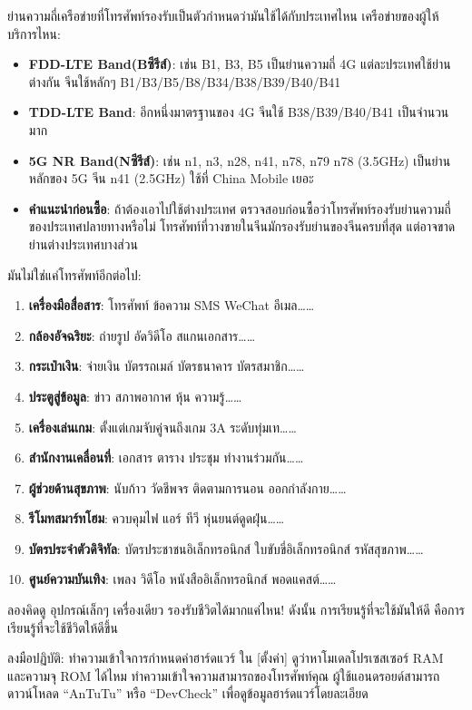 
ย่านความถี่เครือข่ายที่โทรศัพท์รองรับเป็นตัวกำหนดว่ามันใช้ได้กับประเทศไหน เครือข่ายของผู้ให้บริการไหน:

\begin{itemize}
  \item \textbf{FDD-LTE Band(Bซีรีส์)}: เช่น B1, B3, B5 เป็นย่านความถี่ 4G แต่ละประเทศใช้ย่านต่างกัน จีนใช้หลักๆ B1/B3/B5/B8/B34/B38/B39/B40/B41
  \item \textbf{TDD-LTE Band}: อีกหนึ่งมาตรฐานของ 4G จีนใช้ B38/B39/B40/B41 เป็นจำนวนมาก
  \item \textbf{5G NR Band(Nซีรีส์)}: เช่น n1, n3, n28, n41, n78, n79 n78 (3.5GHz) เป็นย่านหลักของ 5G จีน n41 (2.5GHz) ใช้ที่ China Mobile เยอะ
  \item \textbf{คำแนะนำก่อนซื้อ}: ถ้าต้องเอาไปใช้ต่างประเทศ ตรวจสอบก่อนซื้อว่าโทรศัพท์รองรับย่านความถี่ของประเทศปลายทางหรือไม่ โทรศัพท์ที่วางขายในจีนมักรองรับย่านของจีนครบที่สุด แต่อาจขาดย่านต่างประเทศบางส่วน
\end{itemize}


มันไม่ใช่แค่โทรศัพท์อีกต่อไป:

\begin{enumerate}
  \item \textbf{เครื่องมือสื่อสาร}: โทรศัพท์ ข้อความ SMS WeChat อีเมล……
  \item \textbf{กล้องอัจฉริยะ}: ถ่ายรูป อัดวิดีโอ สแกนเอกสาร……
  \item \textbf{กระเป๋าเงิน}: จ่ายเงิน บัตรรถเมล์ บัตรธนาคาร บัตรสมาชิก……
  \item \textbf{ประตูสู่ข้อมูล}: ข่าว สภาพอากาศ หุ้น ความรู้……
  \item \textbf{เครื่องเล่นเกม}: ตั้งแต่เกมจับคู่จนถึงเกม 3A ระดับทุ่มเท……
  \item \textbf{สำนักงานเคลื่อนที่}: เอกสาร ตาราง ประชุม ทำงานร่วมกัน……
  \item \textbf{ผู้ช่วยด้านสุขภาพ}: นับก้าว วัดชีพจร ติดตามการนอน ออกกำลังกาย……
  \item \textbf{รีโมทสมาร์ทโฮม}: ควบคุมไฟ แอร์ ทีวี หุ่นยนต์ดูดฝุ่น……
  \item \textbf{บัตรประจำตัวดิจิทัล}: บัตรประชาชนอิเล็กทรอนิกส์ ใบขับขี่อิเล็กทรอนิกส์ รหัสสุขภาพ……
  \item \textbf{ศูนย์ความบันเทิง}: เพลง วิดีโอ หนังสืออิเล็กทรอนิกส์ พอดแคสต์……
\end{enumerate}

ลองคิดดู อุปกรณ์เล็กๆ เครื่องเดียว รองรับชีวิตได้มากแค่ไหน! ดังนั้น การเรียนรู้ที่จะใช้มันให้ดี คือการเรียนรู้ที่จะใช้ชีวิตให้ดีขึ้น

\begin{tcbpractice}{ลงมือปฏิบัติ: ทำความเข้าใจการกำหนดค่าฮาร์ดแวร์}
ใน [ตั้งค่า] ดูว่าหาโมเดลโปรเซสเซอร์ RAM และความจุ ROM ได้ไหม ทำความเข้าใจความสามารถของโทรศัพท์คุณ ผู้ใช้แอนดรอยด์สามารถดาวน์โหลด “AnTuTu” หรือ “DevCheck” เพื่อดูข้อมูลฮาร์ดแวร์โดยละเอียด

\end{tcbpractice}
